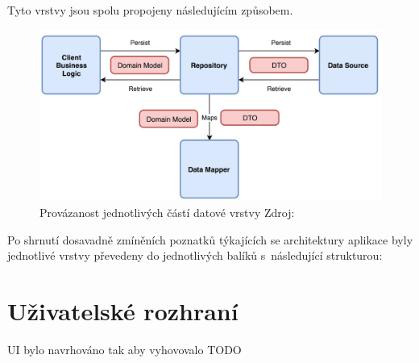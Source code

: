 \bigskip

Tyto vrstvy jsou spolu propojeny následujícím způsobem.

\begin{figure}[H]
  \centering
  \includegraphics[width=.8\textwidth]{arch_diagram.png}
  \caption{Provázanost jednotlivých částí datové vrstvy Zdroj: \cite{imgDataDiagram}}
  \label{fig:arch_diagram}
\end{figure}

\bigskip

Po shrnutí dosavadně zmíněních poznatků týkajících se architektury aplikace byly jednotlivé vrstvy převedeny do jednotlivých balíků s~následující
strukturou:

\bigskip






\section{Uživatelské rozhraní}
UI bylo navrhováno tak aby vyhovovalo TODO


